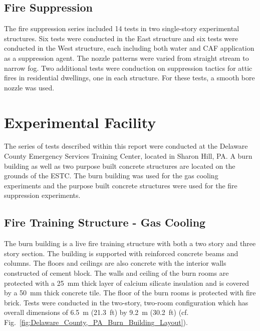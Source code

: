 \documentclass[12pt,oneside]{book}
\begin{document}
\subsection{Fire Suppression}
\label{sec:desc_Fire_Suppression}

The fire suppression series included 14 tests in two single-story experimental structures. Six tests were conducted in the East structure and six tests were conducted in the West structure, each including both water and CAF application as a suppression agent. The nozzle patterns were varied from straight stream to narrow fog. Two additional tests were conduction on suppression tactics for attic fires in residential dwellings, one in each structure. For these tests, a smooth bore nozzle was used.




\section{Experimental Facility}
\label{sec:Experimental_Facility}

The series of tests described within this report were conducted at the Delaware County Emergency Services Training Center, located in Sharon Hill, PA. A burn building as well as two purpose built concrete structures are located on the grounds of the ESTC. The burn building was used for the gas cooling experiments and the purpose built concrete structures were used for the fire suppression experiments.   

\subsection{Fire Training Structure - Gas Cooling}
\label{sec:Burn_Building}

The burn building is a live fire training structure with both a two story and three story section. The building is supported with reinforced concrete beams and columns. The floors and ceilings are also concrete with the interior walls constructed of cement block. The walls and ceiling of the burn rooms are protected with a 25~mm thick layer of calcium silicate insulation and is covered by a 50~mm thick concrete tile. The floor of the burn rooms is protected with fire brick. Tests were conducted in the two-story, two-room configuration which has overall dimensions of 6.5~m (21.3~ft) by 9.2~m (30.2~ft) (cf. Fig.~\ref{fig:Delaware_County,_PA_Burn_Building_Layout}).
\end{document}
